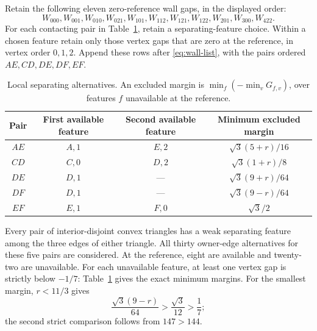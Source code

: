 \documentclass[11pt]{article}
\begin{document}
Retain the following eleven zero-reference wall gaps, in the displayed order:
\begin{equation}\label{eq:wall-list}
 W_{000},W_{001},W_{010},W_{021},W_{101},W_{112},
 W_{121},W_{122},W_{201},W_{300},W_{422}.
\end{equation}
For each contacting pair in Table~\ref{tab:local-features}, retain a separating-feature choice. Within a chosen feature retain only those vertex gaps that are zero at the reference, in vertex order $0,1,2$. Append these rows after \eqref{eq:wall-list}, with the pairs ordered $AE,CD,DE,DF,EF$.

\begin{table}[htbp]
\centering
\begin{tabular}{c c c c}
\hline
Pair & First available feature & Second available feature & Minimum excluded margin\\\hline
$AE$ & $A,1$ & $E,2$ & $\sqrt3(5+r)/16$\\
$CD$ & $C,0$ & $D,2$ & $\sqrt3(1+r)/8$\\
$DE$ & $D,1$ & --- & $\sqrt3(9+r)/64$\\
$DF$ & $D,1$ & --- & $\sqrt3(9-r)/64$\\
$EF$ & $E,1$ & $F,0$ & $\sqrt3/2$\\\hline
\end{tabular}
\caption{Local separating alternatives. An excluded margin is $\min_f(-\min_vG_{f,v})$, over features $f$ unavailable at the reference.}\label{tab:local-features}
\end{table}

Every pair of interior-disjoint convex triangles has a weak separating feature among the three edges of either triangle. All thirty owner-edge alternatives for these five pairs are considered. At the reference, eight are available and twenty-two are unavailable. For each unavailable feature, at least one vertex gap is strictly below $-1/7$: Table~\ref{tab:local-features} gives the exact minimum margins. For the smallest margin, $r<11/3$ gives
\[
 \frac{\sqrt3(9-r)}{64}>\frac{\sqrt3}{12}>\frac17;
\]
the second strict comparison follows from $147>144$.
\end{document}
